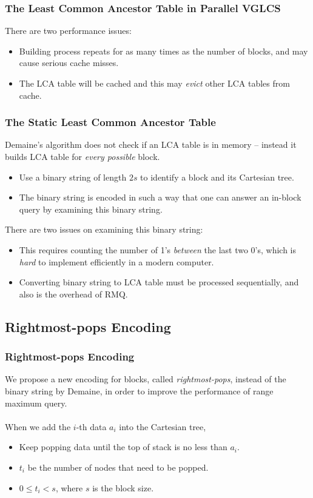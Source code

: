 \begin{frame}
	\frametitle{The Least Common Ancestor Table in Parallel VGLCS}
	There are two performance issues:
	\begin{itemize}
		\setlength\itemsep{1em}
		\item 
			Building process repeats for as many times as the number of
			blocks, and may cause serious cache misses.
		\item
			The LCA table will be cached and this may {\em evict} other
			LCA tables from cache.
	\end{itemize}
\end{frame}

\begin{frame}
	\frametitle{The Static Least Common Ancestor Table}
	Demaine's algorithm does not check if an LCA table is in memory --
	instead it builds LCA table for {\em every possible} block.
	\begin{itemize}
		\setlength\itemsep{1em}
		\item 
			Use a binary string of length $2s$ to identify a block and
			its Cartesian tree.
		\item
			The binary string is encoded in such a way that one can
			answer an in-block query by examining this binary string.
	\end{itemize}
\end{frame}

\begin{frame}
	There are two issues on examining this binary string:
	\begin{itemize}
		\setlength\itemsep{1em}
		\item 
			This requires counting the number of 1's {\em between} the
			last two 0's, which is {\em hard} to implement efficiently
			in a modern computer.
		\item
			Converting binary string to LCA table must be processed
			sequentially, and also is the overhead of RMQ.
	\end{itemize}
\end{frame}

\subsection{Rightmost-pops Encoding}
\begin{frame}
    \frametitle{Rightmost-pops Encoding}
    We propose a new encoding for blocks, called {\em rightmost-pops},
	instead of the binary string by Demaine, in order to improve the
	performance of range maximum query.
	\\~\\
	When we add the $i$-th data $a_i$ into the Cartesian tree, 
	\begin{itemize}
		\setlength\itemsep{1em}
		\item
			Keep popping data until the top of stack is no less than
			$a_i$.
		\item 
			$t_i$ be the number of nodes that need to be popped.
		\item
			$0 \le t_i < s$, where $s$ is the block size.
	\end{itemize}

\end{frame}

